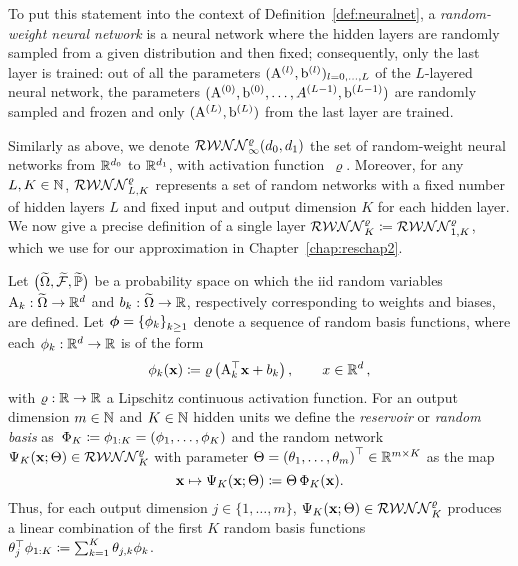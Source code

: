 To put this statement into the context of Definition~\ref{def:neuralnet}, a \textit{random-weight neural network} is a neural network where the hidden layers are randomly sampled from a given distribution and then fixed; consequently, only the last layer is trained:
out of all the parameters $(\mathrm{A}^{(l)}, \mathrm{b}^{(l)})_{l=0,\ldots,L}$ of the $L$-layered neural network, the parameters $(\mathrm{A}^{(0)}, \mathrm{b}^{(0)}, \ldots, A^{(L-1)}, \mathrm{b}^{(L-1)})$ are randomly sampled and frozen and only $(\mathrm{A}^{(L)}, \mathrm{b}^{(L)})$ from the last layer are trained. 

Similarly as above, we denote $\mathcal{RWNN}_{\infty}^{\varrho}(d_0,d_1)$ the set of random-weight neural networks from $\mathbb{R}^{d_0}$ to $\mathbb{R}^{d_1}$, with activation function~$\varrho$. %
Moreover, for any $L, K \in \mathbb{N}$, $\mathcal{RWNN}_{L, K}^\varrho$ represents a set of random networks with a fixed number of hidden layers $L$ and fixed input and output dimension $K$ for each hidden layer. 
We now give a precise definition of a single layer $\mathcal{RWNN}^\varrho_{K}\coloneqq\mathcal{RWNN}^\varrho_{1, K}$, which we use for our approximation in Chapter~\ref{chap:reschap2}.

\begin{definition}\label{def:RWNN}
Let $\big(\widetilde{\Omega}, \widetilde{\mathcal{F}}, \widetilde{\mathbb{P}}\big)$ be a probability space on which the iid random variables $\mathrm{A}_{k}: \widetilde{\Omega} \rightarrow \mathbb{R}^{d}$ and $b_{k}: \widetilde{\Omega} \rightarrow \mathbb{R}$, respectively corresponding to weights and biases, are defined. Let $\boldsymbol{\phi}=\left\{\phi_{k}\right\}_{k \geq 1}$ denote a sequence of random basis functions, where each $\phi_{k}: \mathbb{R}^{d} \to\mathbb{R}$ is of the form
$$
\phi_{k}(\boldsymbol{\mathrm{x}})\coloneqq\varrho\left(\mathrm{A}_{k}^{\top} \boldsymbol{\mathrm{x}} + b_{k}\right), \qquad x\in\mathbb{R}^d\,,
$$
with $\varrho:\mathbb{R}\rightarrow\mathbb{R}$ a Lipschitz continuous activation function. 
For an output dimension $m\in\mathbb{N}$ and $K \in \mathbb{N}$ hidden units we define the \textit{reservoir} or \textit{random basis} as~$\Phi_{K}\coloneqq\nobreak\phi_{1:K}=(\phi_1,\dots,\phi_K)$ and the random network $\Psi_K(\boldsymbol{\mathrm{x}};\Theta)\in\mathcal{RWNN}^\varrho_K$ with parameter $\Theta=\left(\theta_{1}, \ldots, \theta_{m}\right)^\top \in \mathbb{R}^{m\times K}$ as the map %
\[
\boldsymbol{\mathrm{x}} \mapsto \Psi_K(\boldsymbol{\mathrm{x}};\Theta)\coloneqq\Theta\,\Phi_K(\boldsymbol{\mathrm{x}}).
\]
Thus, for each output dimension $j\in\{1,\dots,m\}$, $\Psi_K(\boldsymbol{\mathrm{x}};\Theta)\in\mathcal{RWNN}^\varrho_K$ produces a linear combination of the first $K$ random basis functions $\theta_j^\top\phi_{1:K}\coloneqq\sum_{k=1}^{K} \theta_{j,k} \phi_{k}$.
\end{definition}

